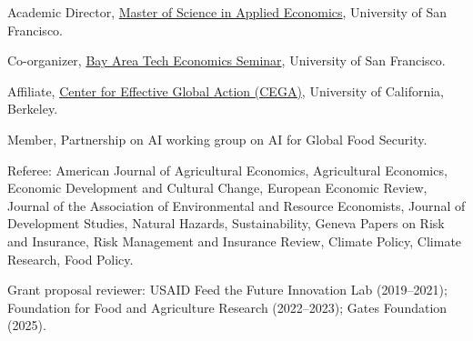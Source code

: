 \documentclass[11pt,letterpaper]{article}
\newcommand{\horse}{5pt} 	%
\newcommand{\littlehorse}{5pt}%
\newenvironment{itemize*}%
  {\begin{itemize}[topsep=0pt, partopsep=0pt, leftmargin=1.6em, itemindent=-1.6em, labelsep=0pt, labelwidth=0pt]%
    \setlength{\itemsep}{\littlehorse}%
    \setlength{\parskip}{0pt}%
    \interlinepenalty=10000}%
  {\end{itemize}\vspace{\horse}}
\newcommand{\resheading}[1]{%
  \vspace{6pt}%
  {\textbf{\large #1}}%
  \par\vspace{4pt}}
\begin{document}
\begin{itemize*}
\item[]{Academic Director, \href{https://www.usfca.edu/arts-sciences/programs/graduate/applied-economics}{Master of Science in Applied Economics}, University of San Francisco.}
\item[]{Co-organizer, \href{https://myusf.usfca.edu/arts-sciences/economics/msae/BATES}{Bay Area Tech Economics Seminar}, University of San Francisco.}
\item[]{Affiliate, \href{https://cega.berkeley.edu/}{Center for Effective Global Action (CEGA)}, University of California, Berkeley.}
\item[]{Member, Partnership on AI working group on AI for Global Food Security.}
\item[]{Referee: American Journal of Agricultural Economics, Agricultural Economics, Economic Development and Cultural Change, European Economic Review, Journal of the Association of Environmental and Resource Economists, Journal of Development Studies, Natural Hazards, Sustainability, Geneva Papers on Risk and Insurance, Risk Management and Insurance Review, Climate Policy, Climate Research, Food Policy.}
\item[]{Grant proposal reviewer: USAID Feed the Future Innovation Lab (2019--2021); Foundation for Food and Agriculture Research (2022--2023); Gates Foundation (2025).}
\end{itemize*}

\end{document}
